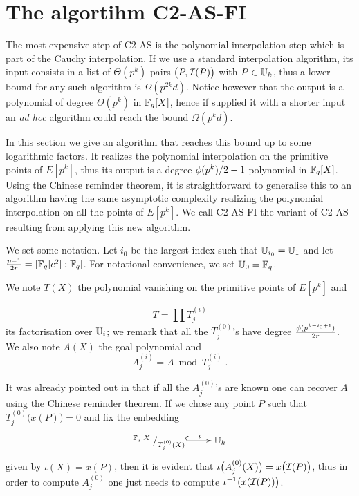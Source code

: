 \section{The algortihm C2-AS-FI}
\label{sec:C2-AS-FI}

The most expensive step of C2-AS is the polynomial interpolation step
which is part of the Cauchy interpolation. If we use a standard
interpolation algorithm, its input consists in a list of $\Theta(p^k)$
pairs $\bigl(P, \mathcal{I}(P)\bigr)$ with $P\in\mathbb{U}_k$, thus a lower bound for
any such algorithm is $\Omega(p^{2k}d)$. Notice however that the
output is a polynomial of degree $\Theta(p^k)$ in $\mathbb{F}_q[X]$, hence if
supplied it with a shorter input an \emph{ad hoc} algorithm could
reach the bound $\Omega(p^kd)$.

In this section we give an algorithm that reaches this bound up to
some logarithmic factors. It realizes the polynomial interpolation on
the primitive points of $E[p^k]$, thus its output is a degree
$\phi(p^k)/2-1$ polynomial in $\mathbb{F}_q[X]$. Using the Chinese reminder
theorem, it is straightforward to generalise this to an algorithm
having the same asymptotic complexity realizing the polynomial
interpolation on all the points of $E[p^k]$. We call C2-AS-FI the
variant of C2-AS resulting from applying this new algorithm.

We set some notation. Let $i_0$ be the largest index such that
$\mathbb{U}_{i_0} = \mathbb{U}_1$ and let $\frac{p-1}{2r} = [\mathbb{F}_q[c^2]:\mathbb{F}_q]$. For
notational convenience, we set $\mathbb{U}_0=\mathbb{F}_q$.

We note $T(X)$ the polynomial vanishing on the primitive points of
$E[p^k]$ and

\begin{equation}
  \label{eq:T}
  T = \prod T_j^{(i)}
\end{equation}
its factorisation over $\mathbb{U}_i$; we remark that all the $T_j^{(0)}$'s
have degree $\frac{\phi(p^{k-i_0+1})}{2r}$. We also note $A(X)$ the goal
polynomial and
\begin{equation}
  \label{eq:A}
  A_j^{(i)} = A \bmod T_j^{(i)}
  \;\text{.}
\end{equation}

It was already pointed out in \cite[$\S$2.3]{Cou96} that if all the
$A_j^{(0)}$'s are known one can recover $A$ using the Chinese reminder
theorem. If we chose any point $P$ such that
$T_j^{(0)}\bigl(x(P)\bigr)=0$ and fix the embedding
\begin{equation}
  \label{eq:embed}
  \xymatrix{
    ^{\F_q[X]}/_{T_j^{(0)}(X)} \ar@{^{(}->}[r]^-\iota & \U_k
  }
\end{equation}
given by $\iota(X) = x(P)$, then it is evident that
$\iota\bigl(A_j^{(0)}(X)\bigr) = x\bigl(\mathcal{I}(P)\bigr)$, thus in order to
compute $A_j^{(0)}$ one just needs to compute
$\iota^{-1}\bigl(x(\mathcal{I}(P))\bigr)$.

